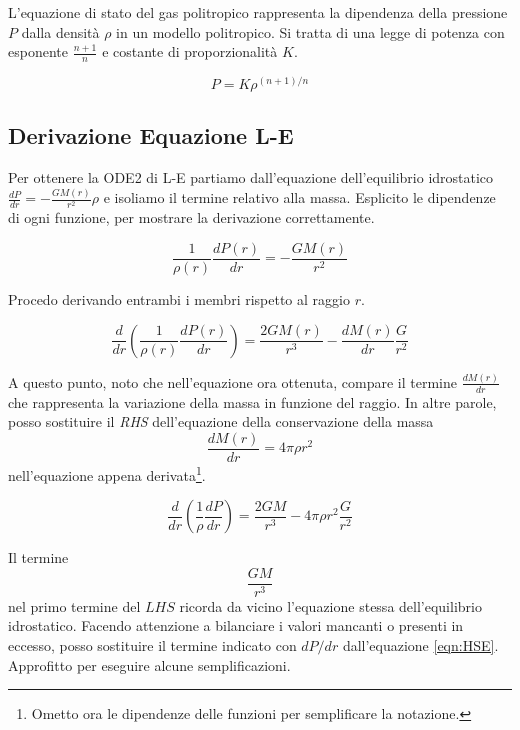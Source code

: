 \documentclass{article}
\begin{document}
L'equazione di stato del gas politropico rappresenta la dipendenza della pressione $P$ dalla densità $\rho$ in un modello politropico. Si tratta di una legge di potenza con esponente $\frac{n+1}{n}$ e costante di proporzionalità $K$.

\begin{equation}\label{eqn:PSE}
 P = K\rho^{(n+1)/n}
\end{equation}

\subsection{Derivazione Equazione L-E}

Per ottenere la ODE2 di L-E partiamo dall'equazione dell'equilibrio idrostatico $\frac{dP}{dr} = -\frac{GM(r)}{r^2}\rho$ e isoliamo il termine relativo alla massa. Esplicito le dipendenze di ogni funzione, per mostrare la derivazione correttamente.

\begin{equation*}
 \frac{1}{\rho(r)}\frac{dP(r)}{dr} = -\frac{GM(r)}{r^2}
\end{equation*}

Procedo derivando entrambi i membri rispetto al raggio $r$.

\begin{equation*}
\frac{d}{dr}\left ( \frac{1}{\rho(r)}\frac{dP(r)}{dr}\right ) = \frac{2GM(r)}{r^3} - \frac{dM(r)}{dr}\frac{G}{r^2}
\end{equation*}

A questo punto, noto che nell'equazione ora ottenuta, compare il termine $\frac{dM(r)}{dr}$ che rappresenta la variazione della massa in funzione del raggio. In altre parole, posso sostituire il \emph{RHS} dell'equazione della conservazione della massa
\begin{equation*}
 \frac{dM(r)}{dr} = 4\pi \rho r^2
\end{equation*}
nell'equazione appena derivata\footnote{Ometto ora le dipendenze delle funzioni per semplificare la notazione.}.

\begin{equation*}
 \frac{d}{dr}\left ( \frac{1}{\rho}\frac{dP}{dr} \right ) = \frac{2GM}{r^3} - 4\pi\rho r^2 \frac{G}{r^2}
\end{equation*}

Il termine $$\frac{GM}{r^3}$$ nel primo termine del $LHS$ ricorda da vicino l'equazione stessa dell'equilibrio idrostatico. Facendo attenzione a bilanciare i valori mancanti o 
presenti in eccesso, posso sostituire il termine indicato con $dP/dr$ dall'equazione \ref{eqn:HSE}. Approfitto per eseguire alcune semplificazioni.
\end{document}
